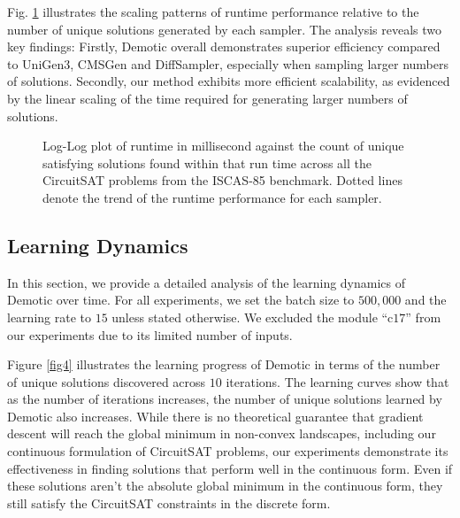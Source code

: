 Fig. \ref{fig3} illustrates the scaling patterns of runtime performance relative to the number of unique solutions generated by each sampler. The analysis reveals two key findings: Firstly, {\sc Demotic} overall demonstrates superior efficiency compared to {\sc UniGen3}, {\sc CMSGen} and {\sc DiffSampler}, especially when sampling larger numbers of solutions. Secondly, our method exhibits more efficient scalability, as evidenced by the linear scaling of the time required for generating larger numbers of solutions.


\begin{figure}
    \centering
    
    \vspace{-1cm}
    \caption{Log-Log plot of runtime in millisecond against the
count of unique satisfying solutions found within that run time across all the CircuitSAT problems from the ISCAS-85 benchmark. Dotted lines denote the trend of the runtime performance for each sampler.}
    \label{fig3}
    \vspace{-0.5cm}
\end{figure}


\vspace{-0.25cm}
\subsection{Learning Dynamics}
In this section, we provide a detailed analysis of the learning dynamics of {\sc Demotic} over time. For all experiments, we set the batch size to $500,000$ and the learning rate to $15$ unless stated otherwise. We excluded the module ``c$17$'' from our experiments due to its limited number of inputs.

Figure \ref{fig4} illustrates the learning progress of {\sc Demotic} in terms of the number of unique solutions discovered across $10$ iterations. The learning curves show that as the number of iterations increases, the number of unique solutions learned by {\sc Demotic} also increases. While there is no theoretical guarantee that gradient descent will reach the global minimum in non-convex landscapes, including our continuous formulation of CircuitSAT problems, our experiments demonstrate its effectiveness in finding solutions that perform well in the continuous form. Even if these solutions aren't the absolute global minimum in the continuous form, they still satisfy the CircuitSAT constraints in the discrete form.

